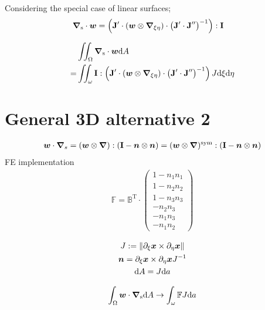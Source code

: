 \documentclass[a4paper,11pt]{article}
\newcommand{\ta}[1]{\text{\boldmath $#1$}} %
\newcommand{\ts}[1]{\text{\boldmath $\mathrm{#1}$}} %
\newcommand{\uv}[1]{\mathbb{#1}}
\newcommand{\um}[1]{\mathbb{#1}}
\newcommand{\dif}[1]{\mathrm{d}#1}
\newcommand{\diff}{\ta{\nabla}}
\newcommand{\pderiv}[2]{\partial_{#2} #1}
\newcommand{\norm}[1]{\left\lVert{#1}\right\rVert}
\newcommand{\T}{\mathrm{T}}
\newcommand{\sym}{\mathrm{sym}}
\newcommand{\surf}{\mathrm{s}}
\newcommand{\defeq}{:=}
\begin{document}
Considering the special case of linear surfaces;
\begin{align}
  \diff_\surf\cdot\ta w &= \left(\ts J'\cdot(\ta w\otimes\diff_{\xi\eta})\cdot \left(\ts J'\cdot\ts J''\right)^{-1}\right): \ts I
\end{align}

\begin{align}
 &\iint_\Omega\diff_\surf\cdot\ta w\dif A\\
=&\iint_\omega \ts I:\left(\ts J'\cdot(\ta w\otimes\diff_{\xi\eta})\cdot \left(\ts J'\cdot\ts J''\right)^{-1}\right)J\dif\xi\dif\eta
\end{align}


\newpage
\section{General 3D alternative 2}
\begin{align}
 \ta w \cdot \ts\nabla_{s} = (\ta w \otimes \diff) : (\ts I - \ta n \otimes \ta n)= (\ta w \otimes \diff)^\sym : (\ts I - \ta n \otimes \ta n)
\end{align}
FE implementation
\begin{align}
 \uv F = \um{B}^\T \cdot \begin{pmatrix} 1 - n_1 n_1 \\ 1 - n_2 n_2 \\ 1 - n_3 n_3 \\ -n_2 n_3 \\ -n_1 n_3 \\ -n_1 n_2 \end{pmatrix}
\end{align}


\begin{gather}
 J \defeq \norm{\pderiv{\ta x}{\xi} \times  \pderiv{\ta x}{\eta}}\\
 \ta n = \pderiv{\ta x}{\xi} \times \pderiv{\ta x}{\eta} J^{-1}\\
 \dif A = J \dif a
\end{gather}

\begin{align}
 \int_\Omega \ta w\cdot\diff_\surf \dif A \to \int_\omega \uv F J \dif a
\end{align}
\end{document}

